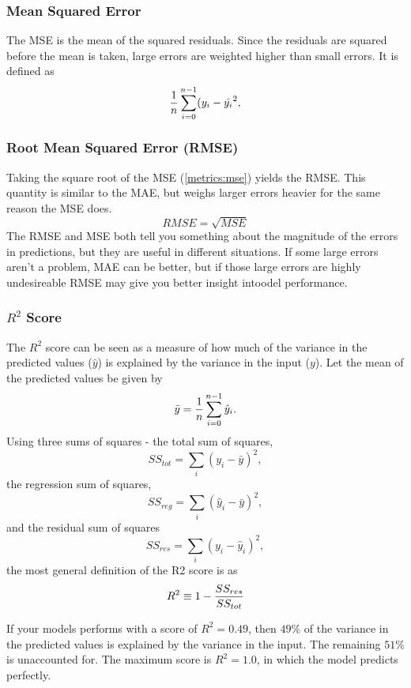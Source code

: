 \subsubsection{Mean Squared Error}
The MSE is the mean of the squared residuals. Since the residuals are squared
before the mean is taken, large errors are weighted higher than small errors.
It is defined as
\begin{equation}\label{metrics:mse}
    \frac{1}{n}\sum_{i=0}^{n-1}(y_i - \hat{y_i}^{2},
\end{equation}

\subsubsection{Root Mean Squared Error (RMSE)}
Taking the square root of the MSE (\ref{metrics:mse}) yields the RMSE.
This quantity is similar to the MAE, but weighs larger errors heavier
for the same reason the MSE does.
\begin{equation}
    RMSE = \sqrt{MSE}
\end{equation}
The RMSE and MSE both tell you something about the magnitude of the errors
in predictions, but they are useful in different situations. If some large
errors aren't a problem, MAE can be better, but if those large errors are
highly undesireable RMSE may give you better insight intoodel performance.

\subsubsection{$R^2$ Score}
The $R^2$ score can be seen as a measure of how much of the variance in the
predicted values ($\hat{y}$) is explained by the variance in the input ($y$).
Let the mean of the predicted values be given by
\begin{equation}\label{metrics:mean}
    \bar{y} =\frac{1}{n}\sum_{i=0}^{n-1}\hat{y}_{i}.
\end{equation}
Using three sums of squares - the total sum of squares,
\begin{equation}
    SS_{tot} = \sum_{i}(y_i - \bar{y})^{2},
\end{equation}
the regression sum of squares,
\begin{equation}
    SS_{reg} = \sum_{i}(\hat{y}_i - \bar{y})^{2},
\end{equation}
and the residual sum of squares
\begin{equation}
    SS_{res} = \sum_{i}(y_i - \hat{y}_i)^{2},
\end{equation}
the most general definition of the R2 score is as
\begin{equation}
    R^2 \equiv 1 - \frac{SS_{res}}{SS_{tot}}
\end{equation}

If your models performs with a score of $R^2 = 0.49$, then $49\%$ of the
variance in the predicted values is explained by the variance in the input.
The remaining $51\%$ is unaccounted for. The maximum score is $R^2 = 1.0$,
in which the model predicts perfectly.
